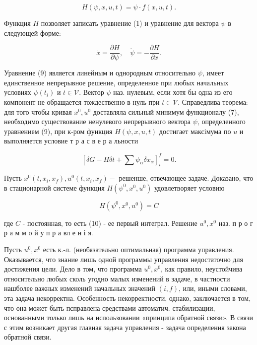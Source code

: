\documentclass[10pt]{article}
\begin{document}
\[

H(\psi, x, u, t)=\psi \cdot f(x, u, t) .

\]



Функция $H$ позволяет записать уравнение (1) и уравнение для вектора $\psi$ в следующей форме:



\[

\dot{x}=\frac{\partial H}{\partial \psi}, \quad \dot{\psi}=-\frac{\partial H}{\partial x} .

\]



Уравнение (9) является линейным и однородным относительно $\psi$, имеет единственное непрерывное решение, определенное при любых начальных условиях $\psi\left(t_{i}\right)$ и $t \in \mathscr{V}$. Вектор $\psi$ наз. нулевым, если хотя бы одна из его компонент не обращается тождественно в нуль при $t \in \mathscr{V}$. Справедлива теорема: для того чтобы кривая $x^{0}, u^{0}$ доставляла сильный минимум функционалу (7), необходимо существование ненулевого непрерывного вектора $\psi$, определенного уравнением (9), при к-ром функция $H(\psi, x, u, t)$ достигает максімума по $u$ и выполняется условие т р а с в е р а льности



\[

\left[\delta G-H \delta t+\sum \psi_{\alpha} \delta x_{\alpha}\right]_{i}^{f}=0 .

\]



Пусть $x^{0}\left(t, x_{i}, x_{f}\right), u^{0}\left(t, x_{i}, x_{f}\right)-$ решенше, отвечающее задаче. Доказано, что в стационарной системе функция $H\left(\psi^{0}, x^{0}, u^{0}\right)$ удовлетворяет условию



\[

H\left(\psi^{0}, x^{0}, u^{0}\right)=C

\]



где $C$ - постоянная, то есть (10) - ее первый интеграл. Решение $u^{0}, x^{0}$ наз. п р о г р а м м о й у п р а вл е н і я.



Пусть $u^{0}, x^{0}$ есть к.-л. (необязательно оптимальная) программа управления. Оказывается, что знание лишь одной программы управления недостаточно для достижения цели. Дело в том, что программа $u^{0}, x^{0}$, как правило, неустойчива относительно любых сколь угодно малых изменений в задаче, в частности нашболее важных изменений начальных значений $(i, f)$, или, иными словами, эта задача некорректна. Особенность некорректности, однако, заключается в том, что она может быть псправлена средствами автоматич. стабилизации, основанными только лишь на использовании «принципа обратной связи». В связи с этим возникает другая главная задача управления - задача определения закона обратной связи.
\end{document}
